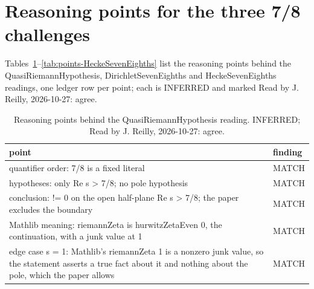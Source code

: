 \section{Reasoning points for the three 7/8 challenges}\label{app:reasoning}

Tables~\ref{tab:points-QuasiRiemannHypothesis}--\ref{tab:points-HeckeSevenEighths} list the reasoning points behind the QuasiRiemannHypothesis, DirichletSevenEighths and HeckeSevenEighths readings, one ledger row per point; each is INFERRED and marked Read by J. Reilly, 2026-10-27: agree. %

\begin{table}[!htbp]
\caption{Reasoning points behind the QuasiRiemannHypothesis reading. INFERRED; Read by J. Reilly, 2026-10-27: agree.}\label{tab:points-QuasiRiemannHypothesis} %
\scriptsize\setlength{\tabcolsep}{3pt}\renewcommand{\arraystretch}{0.95}
\begin{tabularx}{\textwidth}{@{}>{\raggedright\arraybackslash}Xl@{}}
\toprule
point & finding \\ %
\midrule
quantifier order: 7/8 is a fixed literal & MATCH \\ %
hypotheses: only Re s > 7/8; no pole hypothesis & MATCH \\ %
conclusion: != 0 on the open half-plane Re s > 7/8; the paper excludes the boundary & MATCH \\ %
Mathlib meaning: riemannZeta is hurwitzZetaEven 0, the continuation, with a junk value at 1 & MATCH \\ %
edge case s = 1: Mathlib's riemannZeta 1 is a nonzero junk value, so the statement asserts a true fact about it and nothing about the pole, which the paper allows & MATCH \\ %
\bottomrule
\end{tabularx}
\end{table}

